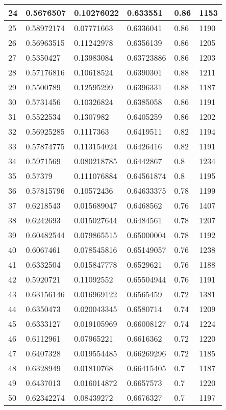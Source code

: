 \begin{longtable}{|l|l|l|l|l|l|}
24 & 0.5676507 & 0.10276022 & 0.633551 & 0.86 & 1153 \\ \hline 
25 & 0.58972174 & 0.07771663 & 0.6336041 & 0.86 & 1190 \\ \hline 
26 & 0.56963515 & 0.11242978 & 0.6356139 & 0.86 & 1205 \\ \hline 
27 & 0.5350427 & 0.13983084 & 0.63723886 & 0.86 & 1203 \\ \hline 
28 & 0.57176816 & 0.10618524 & 0.6390301 & 0.88 & 1211 \\ \hline 
29 & 0.5500789 & 0.12595299 & 0.6396331 & 0.88 & 1187 \\ \hline 
30 & 0.5731456 & 0.10326824 & 0.6385058 & 0.86 & 1191 \\ \hline 
31 & 0.5522534 & 0.1307982 & 0.6405259 & 0.86 & 1202 \\ \hline 
32 & 0.56925285 & 0.1117363 & 0.6419511 & 0.82 & 1194 \\ \hline 
33 & 0.57874775 & 0.113154024 & 0.6426416 & 0.82 & 1191 \\ \hline 
34 & 0.5971569 & 0.080218785 & 0.6442867 & 0.8 & 1234 \\ \hline 
35 & 0.57379 & 0.111076884 & 0.64561874 & 0.8 & 1195 \\ \hline 
36 & 0.57815796 & 0.10572436 & 0.64633375 & 0.78 & 1199 \\ \hline 
37 & 0.6218543 & 0.015689047 & 0.6468562 & 0.76 & 1407 \\ \hline 
38 & 0.6242693 & 0.015027644 & 0.6484561 & 0.78 & 1207 \\ \hline 
39 & 0.60482544 & 0.079865515 & 0.65000004 & 0.78 & 1192 \\ \hline 
40 & 0.6067461 & 0.078545816 & 0.65149057 & 0.76 & 1238 \\ \hline 
41 & 0.6332504 & 0.015847778 & 0.6529621 & 0.76 & 1188 \\ \hline 
42 & 0.5920721 & 0.11092552 & 0.65504944 & 0.76 & 1191 \\ \hline 
43 & 0.63156146 & 0.016969122 & 0.6565459 & 0.72 & 1381 \\ \hline 
44 & 0.6350473 & 0.020043345 & 0.6580714 & 0.74 & 1209 \\ \hline 
45 & 0.6333127 & 0.019105969 & 0.66008127 & 0.74 & 1224 \\ \hline 
46 & 0.6112961 & 0.07965221 & 0.6616362 & 0.72 & 1220 \\ \hline 
47 & 0.6407328 & 0.019554485 & 0.66269296 & 0.72 & 1185 \\ \hline 
48 & 0.6328949 & 0.01810768 & 0.66415405 & 0.7 & 1187 \\ \hline 
49 & 0.6437013 & 0.016014872 & 0.6657573 & 0.7 & 1220 \\ \hline 
50 & 0.62342274 & 0.08439272 & 0.6676327 & 0.7 & 1197 \\ \hline 
\end{longtable}